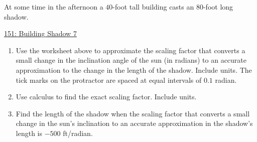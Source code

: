 \documentclass{ximera}
\begin{document}
\begin{exercise} \label{ExKdm4090}
At some time in the afternoon a $40$-foot tall building casts an $80$-foot long shadow.

\begin{onlineOnly}
    \begin{center}
\end{center}
\end{onlineOnly}

\href{https://www.desmos.com/calculator/5qqd2t4eny}{151: Building Shadow 7}

\begin{enumerate}
\item Use the worksheet above to approximate the scaling factor that converts a small change in the inclination angle of the sun (in radians) to an accurate approximation to the change in the length of the shadow. Include units. The tick marks on the protractor are spaced at equal intervals of $0.1$ radian.

\item Use calculus to find the exact scaling factor. Include units.

\item Find the length of the shadow when the scaling factor that converts a small change in the sun's inclination to an accurate approximation in the shadow's length is $-500$ ft/radian.
\end{enumerate}


\end{exercise}
\end{document}

